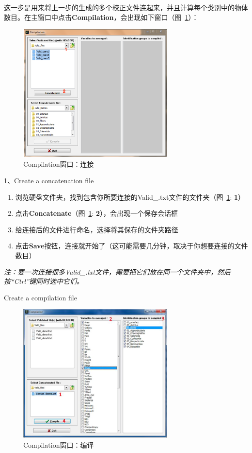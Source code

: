 \documentclass[12pt]{article}
\begin{document}
这一步是用来将上一步的生成的多个校正文件连起来，并且计算每个类别中的物体数目。在主窗口中点击\textbf{Compilation}，会出现如下窗口（图~\ref{fig: CompilationWindow1}）：

\begin{figure}[!ht]
\centering
\includegraphics[width=0.7\textwidth]{CompilationWindow1.eps}
\caption{Compilation窗口：连接}
\label{fig: CompilationWindow1}
\end{figure}

1、Create a concatenation file

\begin{enumerate}
\item 浏览硬盘文件夹，找到包含你所要连接的Valid\_.txt文件的文件夹（图~\ref{fig: CompilationWindow1}: {\color{red}\textbf{1}}）
\item 点击\textbf{Concatenate}（图~\ref{fig: CompilationWindow1}: {\color{red}\textbf{2}}），会出现一个保存会话框
\item 给连接后的文件进行命名，选择将其保存的文件夹路径
\item 点击\textbf{Save}按钮，连接就开始了（这可能需要几分钟，取决于你想要连接的文件数目）
\end{enumerate}

{\color{blue}\textit{注：要一次连接很多Valid\_.txt文件，需要把它们放在同一个文件夹中，然后按“Ctrl”键同时选中它们。}}

{\color{red}Create a compilation file}

\begin{figure}[!ht]
\centering
\includegraphics[width=0.7\textwidth]{CompilationWindow2}
\caption{Compilation窗口：编译}
\label{fig: CompilationWindow2}
\end{figure}
\end{document}
